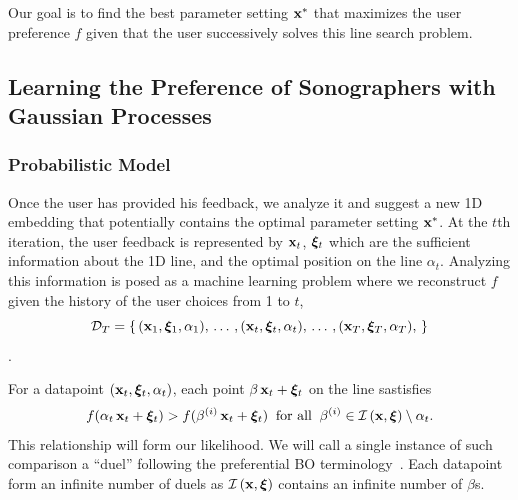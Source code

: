 Our goal is to find the best parameter setting \(\mathbf{x}^{*}\) that maximizes the user preference \(f\) given that the user successively solves this line search problem.

\subsection{Learning the Preference of Sonographers with Gaussian Processes}\label{section:gp}
\subsubsection{Probabilistic Model}
Once the user has provided his feedback, we analyze it and suggest a new 1D embedding that potentially contains the optimal parameter setting \(\mathbf{x}^{*}\).
At the \(t\)th iteration, the user feedback is represented by \(\mathbf{x}_t\), \(\bm{\xi}_t\) which are the sufficient information about the 1D line, and the optimal position on the line \(\alpha_t\).
Analyzing this information is posed as a machine learning problem where we reconstruct \(f\) given the history of the user choices from 1 to \(t\), \[\mathcal{D}_T = \{\,(\mathbf{x}_1, \bm{\xi}_1, \alpha_1),\, \ldots\,, (\mathbf{x}_t, \bm{\xi}_t, \alpha_t),\,\ldots\,, (\mathbf{x}_T, \bm{\xi}_T, \alpha_T), \,\}\].

For a datapoint \( (\mathbf{x}_t, \bm{\xi}_t, \alpha_t) \), each point \(\beta\,\mathbf{x}_t + \bm{\xi}_t\) on the line sastisfies
\begin{align}
f(\alpha_t\,\mathbf{x}_t + \bm{\xi}_t ) > f(\beta^{(i)}\,\mathbf{x}_t + \bm{\xi}_t) \;\;\text{for all}\;\; \beta^{(i)} \in \mathcal{I}\left(\mathbf{x}, \bm{\xi}\right) \setminus \alpha_t. \label{eq:likelihood}
\end{align}
This relationship will form our likelihood.
We will call a single instance of such comparison a ``duel'' following the preferential BO terminology~\cite{pmlr-v70-gonzalez17a}.
Each datapoint form an infinite number of duels as \(\mathcal{I}\left(\mathbf{x}, \bm{\xi}\right)\) contains an infinite number of \(\beta\)s.

